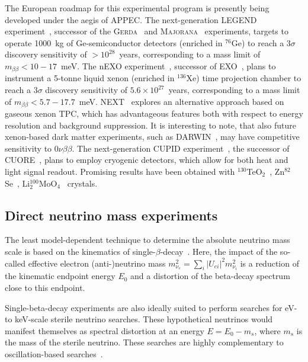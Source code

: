 The European roadmap for this experimental program is presently being developed under the aegis of APPEC.
The next-generation LEGEND experiment~\cite{DAndrea:2019umy}, successor of the \textsc{Gerda}~\cite{Agostini:2018tnm} and \textsc{Majorana}~\cite{Aalseth:2017btx, Alvis:2019sil} experiments, targets to operate 1000~kg of Ge-semiconductor detectors (enriched in ${}^{76}$Ge) to reach a 3$\sigma$ discovery sensitivity of $>10^{28}$~years, corresponding to a mass limit of $m_{\beta\beta} < 10 - 17 $~meV. The nEXO experiment~\cite{Albert:2017hjq}, successor of EXO~\cite{Albert:2017owj}, plans to instrument a 5-tonne liquid xenon (enriched in ${}^{136}$Xe) time projection chamber to reach a 3$\sigma$ discovery sensitivity of $5.6\times 10^{27}$~years, corresponding to a mass limit of $m_{\beta\beta} < 5.7 - 17.7$~meV. NEXT~\cite{Alvarez:2011my} explores an alternative approach based on gaseous xenon TPC, which has advantageous features both with respect to energy resolution and background suppression. It is interesting to note, that also future xenon-based dark matter experiments, such as DARWIN~\cite{Aalbers:2016jon}, may have competitive sensitivity to $0\nu\beta\beta$. The next-generation CUPID experiment~\cite{Azzolini:2018tum}, the successor of CUORE~\cite{Alduino:2017ehq}, plans to employ cryogenic detectors, which allow for both heat and light signal readout. Promising results have been obtained with $^{130}$TeO$_{2}$~\cite{Artusa:2016mat}, Zn$^{82}$Se~\cite{Azzolini:2018dyb}, Li$_2^{100}$MoO$_4$~\cite{Bekker:2014tfa} crystals. %

\subsection{Direct neutrino mass experiments}
The least model-dependent technique to determine the absolute neutrino mass scale is based on the kinematics of single-$\beta$-decay~\cite{Drex13}. Here, the impact of the so-called effective electron (anti-)neutrino mass $m^2_{\nu_e}  = \sum_i |U_{ei}|^2 m_{\nu_i}^2$ is a reduction of the kinematic endpoint energy $E_0$ and a distortion of the beta-decay spectrum close to this endpoint. 

Single-beta-decay experiments are also ideally suited to perform searches for eV- to keV-scale sterile neutrino searches. These hypothetical neutrinos would manifest themselves as spectral distortion at an energy $E = E_0 - m_s$, where $m_s$ is the mass of the sterile neutrino. These searches are highly complementary to oscillation-based searches~\cite{Boser:2019rta, Mer:2015a}. 

